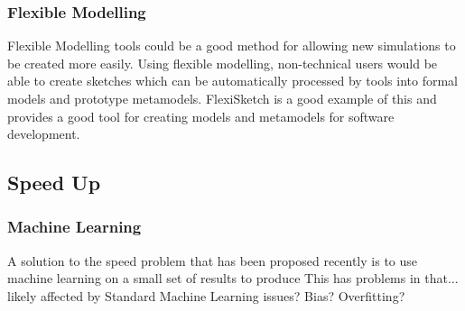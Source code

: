 \documentclass{UoYCSproject}
\begin{document}






\subsubsection{Flexible Modelling}
Flexible Modelling tools could be a good method for allowing new simulations to be created more easily. Using flexible modelling, non-technical users would be able to create sketches which can be automatically processed by tools into formal models and prototype metamodels\cite{Paige2017}. FlexiSketch is a good example of this and provides a good tool for creating models and metamodels for software development\cite{flexisketch}.

\subsection{Speed Up}

\subsubsection{Machine Learning}
A solution to the speed problem that has been proposed recently is to use machine learning on a small set of results to produce\cite{kieran_machine_learning}
This has problems in that...
likely affected by Standard Machine Learning issues? Bias? Overfitting?
\end{document}

